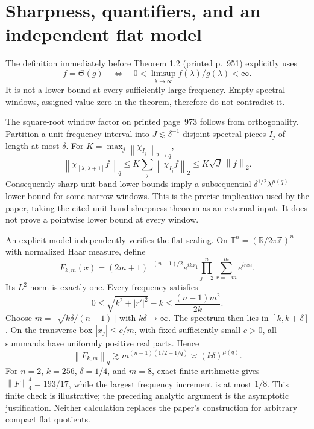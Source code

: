 \documentclass[10pt]{article}
\begin{document}
\section*{Sharpness, quantifiers, and an independent flat model}
The definition immediately before Theorem 1.2 (printed p. 951) explicitly uses \[f=\Theta(g)\quad\Longleftrightarrow\quad
 0<\limsup_{\lambda\to\infty} f(\lambda)/g(\lambda)<\infty .\] It is not a lower bound at every sufficiently large frequency. Empty spectral windows, assigned value zero in the theorem, therefore do not contradict it.\par
The square-root window factor on printed page 973 follows from orthogonality. Partition a unit frequency interval into \(J\lesssim\delta^{-1}\) disjoint spectral pieces \(I_j\) of length at most \(\delta\). For \(K=\max_j\left\lVert\chi_{I_j}\right\rVert_{2\to q}\), \[\left\lVert\chi_{[\lambda,\lambda+1]}f\right\rVert_q
 \le K\sum_j\left\lVert\chi_{I_j}f\right\rVert_2
 \le K\sqrt J\,\left\lVert f\right\rVert_2 .\] Consequently sharp unit-band lower bounds imply a subsequential \(\delta^{1/2}\lambda^{\mu(q)}\) lower bound for some narrow windows. This is the precise implication used by the paper, taking the cited unit-band sharpness theorem as an external input. It does not prove a pointwise lower bound at every window.\par
An explicit model independently verifies the flat scaling. On \(\mathbb T^n=(\mathbb R/2\pi\mathbb Z)^n\) with normalized Haar measure, define \[F_{k,m}(x)=(2m+1)^{-(n-1)/2}e^{ikx_1}
       \prod_{j=2}^{n}\sum_{r=-m}^{m}e^{irx_j}.\] Its \(L^2\) norm is exactly one. Every frequency satisfies \[0\le\sqrt{k^2+|r'|^2}-k
 \le\frac{(n-1)m^2}{2k}.\] Choose \(m=\lfloor\sqrt{k\delta/(n-1)}\rfloor\) with \(k\delta\to\infty\). The spectrum then lies in \([k,k+\delta]\). On the transverse box \(|x_j|\le c/m\), with fixed sufficiently small \(c>0\), all summands have uniformly positive real parts. Hence \[\left\lVert F_{k,m}\right\rVert_q\gtrsim
 m^{(n-1)(1/2-1/q)}
 \asymp(k\delta)^{\mu(q)}.\] For \(n=2\), \(k=256\), \(\delta=1/4\), and \(m=8\), exact finite arithmetic gives \(\left\lVert F\right\rVert_{4}^{4}=193/17\), while the largest frequency increment is at most \(1/8\). This finite check is illustrative; the preceding analytic argument is the asymptotic justification. Neither calculation replaces the paper’s construction for arbitrary compact flat quotients.\par
\end{document}
